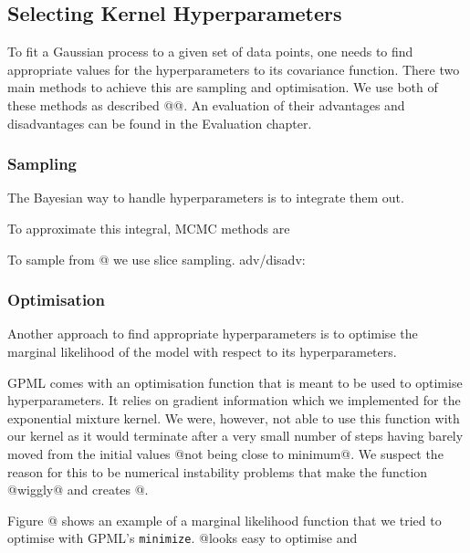 \documentclass[a4paper,12pt,twoside,openright]{report}
\begin{document}
\subsection{Selecting Kernel Hyperparameters}
To fit a Gaussian process to a given set of data points, one needs to find appropriate values for the hyperparameters to its covariance function. There two main methods to achieve this are sampling and optimisation. We use both of these methods as described @@. An evaluation of their advantages and disadvantages can be found in the Evaluation chapter.

\subsubsection{Sampling}
The Bayesian way to handle hyperparameters is to integrate them out. 

To approximate this integral, MCMC methods are

To sample from @ we use slice sampling. adv/disadv: \cite{neal2003}



\subsubsection{Optimisation}
Another approach to find appropriate hyperparameters is to optimise the marginal likelihood of the model with respect to its hyperparameters.

GPML comes with an optimisation function that is meant to be used to optimise hyperparameters. It relies on gradient information which we implemented for the exponential mixture kernel. We were, however, not able to use this function with our kernel as it would terminate after a very small number of steps having barely moved from the initial values @not being close to minimum@. We suspect the reason for this to be numerical instability problems that make the function @wiggly@ and creates @.

Figure @ shows an example of a marginal likelihood function that we tried to optimise with GPML's \texttt{minimize}. @looks easy to optimise and 




\end{document}
